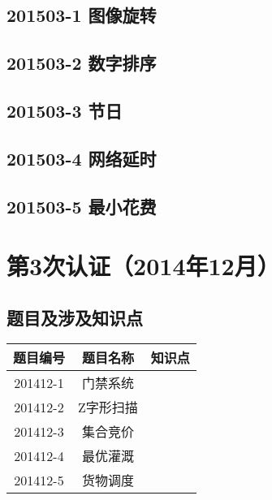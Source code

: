\documentclass[cn,10pt,math=newtx,citestyle=gb7714-2015,bibstyle=gb7714-2015]{elegantbook}
\newif\ifonlyanalyze %
\begin{document}
\newpage
\section{201503-1 图像旋转}
\ifonlyanalyze
\else
    
\fi


\newpage
\section{201503-2 数字排序}
\ifonlyanalyze
\else
    
\fi


\newpage
\section{201503-3 节日}
\ifonlyanalyze
\else
    
\fi


\newpage
\section{201503-4 网络延时}
\ifonlyanalyze
\else
    
\fi


\newpage
\section{201503-5 最小花费}
\ifonlyanalyze
\else
    
\fi



\chapter{第3次认证（2014年12月）}

\section{题目及涉及知识点}

\begin{table}[htbp]
    \centering
    \begin{tabular}{ccc}
        \toprule
        题目编号 & 题目名称  & 知识点 \\
        \midrule
        201412-1 & 门禁系统  &        \\
        201412-2 & Z字形扫描 &        \\
        201412-3 & 集合竞价  &        \\
        201412-4 & 最优灌溉  &        \\
        201412-5 & 货物调度  &        \\
        \bottomrule
    \end{tabular}
\end{table}
\end{document}
